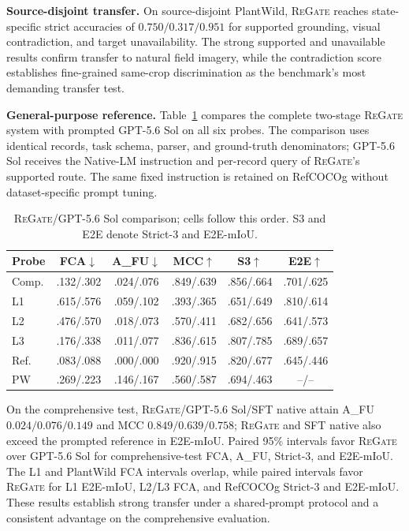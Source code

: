 \documentclass[letterpaper]{article}
\newcommand{\Method}{\textsc{ReGate}\xspace}
\begin{document}
\textbf{Source-disjoint transfer.}
On source-disjoint PlantWild, \Method reaches state-specific strict accuracies of $0.750/0.317/0.951$ for supported grounding, visual contradiction, and target unavailability. The strong supported and unavailable results confirm transfer to natural field imagery, while the contradiction score establishes fine-grained same-crop discrimination as the benchmark's most demanding transfer test.

\textbf{General-purpose reference.}
Table~\ref{tab:gpt56_full} compares the complete two-stage \Method system with prompted GPT-5.6 Sol on all six probes. The comparison uses identical records, task schema, parser, and ground-truth denominators; GPT-5.6 Sol receives the Native-LM instruction and per-record query of \Method's supported route. The same fixed instruction is retained on RefCOCOg without dataset-specific prompt tuning.

\begin{table}[t]
\centering
\small
\setlength{\tabcolsep}{1mm}
\begin{tabular*}{\columnwidth}{@{\extracolsep{\fill}}lccccc@{}}
\toprule
Probe & FCA$\downarrow$ & A\_FU$\downarrow$ & MCC$\uparrow$ & S3$\uparrow$ & E2E$\uparrow$ \\
\midrule
Comp. & .132/.302 & .024/.076 & .849/.639 & .856/.664 & .701/.625 \\
L1 & .615/.576 & .059/.102 & .393/.365 & .651/.649 & .810/.614 \\
L2 & .476/.570 & .018/.073 & .570/.411 & .682/.656 & .641/.573 \\
L3 & .176/.338 & .011/.077 & .836/.615 & .807/.785 & .689/.657 \\
Ref. & .083/.088 & .000/.000 & .920/.915 & .820/.677 & .645/.446 \\
PW & .269/.223 & .146/.167 & .560/.587 & .694/.463 & --/-- \\
\bottomrule
\end{tabular*}
\caption{\Method/GPT-5.6 Sol comparison; cells follow this order. S3 and E2E denote Strict-3 and E2E-mIoU.}
\label{tab:gpt56_full}
\end{table}

On the comprehensive test, \Method/GPT-5.6 Sol/SFT native attain A\_FU $0.024/0.076/0.149$ and MCC $0.849/0.639/0.758$; \Method and SFT native also exceed the prompted reference in E2E-mIoU. Paired 95\% intervals favor \Method over GPT-5.6 Sol for comprehensive-test FCA, A\_FU, Strict-3, and E2E-mIoU. The L1 and PlantWild FCA intervals overlap, while paired intervals favor \Method for L1 E2E-mIoU, L2/L3 FCA, and RefCOCOg Strict-3 and E2E-mIoU. These results establish strong transfer under a shared-prompt protocol and a consistent advantage on the comprehensive evaluation.
\end{document}
